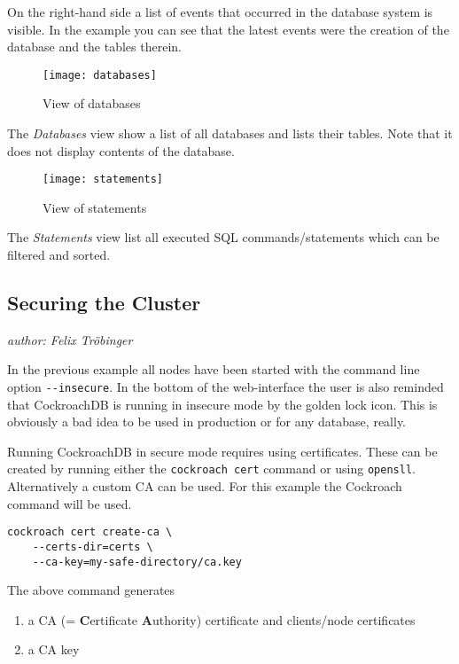 On the right-hand side a list of events that occurred in the database system is visible. In the example you can see that the latest events were the creation of the database and the tables therein.

\begin{figure}[H]
    \texttt{[image: databases]}
    \caption{View of databases}
    \label{fig:databases}
\end{figure}
The \emph{Databases} view show a list of all databases and lists their tables. Note that it does not display contents of the database.

\begin{figure}[H]
    \texttt{[image: statements]}
    \caption{View of statements}
    \label{fig:statements}
\end{figure}

The \emph{Statements} view list all executed SQL commands/statements which can be filtered and sorted. 

\subsection{Securing the Cluster}\label{chap:secure}
\emph{author: Felix Tröbinger}\bigskip

In the previous example all nodes have been started with the command line option \verb|--insecure|. In the bottom of the web-interface the user is also reminded that CockroachDB is running in insecure mode by the golden lock icon. This is obviously a bad idea to be used in production or for any database, really. 

\medskip
Running CockroachDB in secure mode requires using certificates. These can be created by running either the \verb|cockroach cert| command or using \verb|opensll|. Alternatively a custom CA can be used.\cite{cockroach-cert}
For this example the Cockroach command will be used.

\begin{verbatim}
cockroach cert create-ca \ 
    --certs-dir=certs \
    --ca-key=my-safe-directory/ca.key
\end{verbatim}

The above command generates 
\begin{enumerate}
    \item a CA (= \textbf{C}ertificate \textbf{A}uthority) certificate and clients/node certificates
    \item a CA key 
\end{enumerate}

